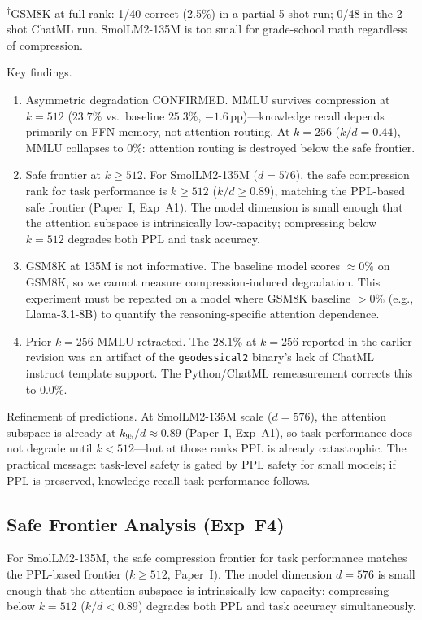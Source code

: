 \documentclass[11pt]{article}
\begin{document}
\smallskip
\noindent\textsuperscript{$\dagger$}GSM8K at full rank: 1/40 correct
(2.5\%) in a partial 5-shot run; 0/48 in the 2-shot ChatML run.
SmolLM2-135M is too small for grade-school math regardless of compression.

Key findings.
\begin{enumerate}
\item Asymmetric degradation CONFIRMED.  MMLU survives compression
      at $k{=}512$ ($23.7\%$ vs.\ baseline $25.3\%$, $-1.6$\,pp)---knowledge
      recall depends primarily on FFN memory, not attention routing.
      At $k{=}256$ ($k/d{=}0.44$), MMLU collapses to $0\%$: attention
      routing is destroyed below the safe frontier.
\item Safe frontier at $k{\ge}512$.  For SmolLM2-135M ($d{=}576$),
      the safe compression rank for task performance is $k{\ge}512$
      ($k/d{\ge}0.89$), matching the PPL-based safe frontier (Paper~I,
      Exp~A1).  The model dimension is small enough that the attention
      subspace is intrinsically low-capacity; compressing below
      $k{=}512$ degrades both PPL and task accuracy.
\item GSM8K at 135M is not informative.  The baseline model
      scores ${\approx}0\%$ on GSM8K, so we cannot measure
      compression-induced degradation.  This experiment must be repeated
      on a model where GSM8K baseline ${>}0\%$ (e.g., Llama-3.1-8B) to
      quantify the reasoning-specific attention dependence.
\item Prior $k{=}256$ MMLU retracted.  The $28.1\%$ at $k{=}256$
      reported in the earlier revision was an artifact of the
      \texttt{geodessical2} binary's lack of ChatML instruct template
      support.  The Python/ChatML remeasurement corrects this to $0.0\%$.
\end{enumerate}

Refinement of predictions.  At SmolLM2-135M scale ($d{=}576$),
the attention subspace is already at $k_{95}/d{\approx}0.89$ (Paper~I,
Exp~A1), so task performance does not degrade until $k{<}512$---but at
those ranks PPL is already catastrophic.  The practical message:
task-level safety is gated by PPL safety for small models; if PPL is
preserved, knowledge-recall task performance follows.

\subsection{Safe Frontier Analysis (Exp~F4)}

For SmolLM2-135M, the safe compression frontier for task performance
matches the PPL-based frontier ($k{\ge}512$, Paper~I).  The model
dimension $d{=}576$ is small enough that the attention subspace is
intrinsically low-capacity: compressing below $k{=}512$ ($k/d{<}0.89$)
degrades both PPL and task accuracy simultaneously.
\end{document}
